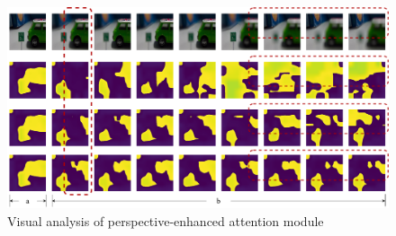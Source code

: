\begin{figure}[!ht]
	\centering
	\includegraphics[width=\linewidth]{figures/chapter4/attn_show}
	{Visual analysis of perspective-enhanced attention module}
	\label{chpt4:figure:attn_show}
\end{figure}


